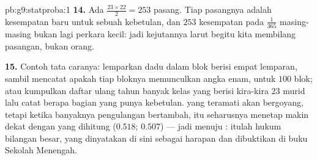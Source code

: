 \begin{solution}{pb:g9:statproba:1}
\textbf{14.} Ada $\frac{23 \times 22}{2} = 253$ pasang. Tiap pasangnya
adalah kesempatan baru untuk sebuah kebetulan, dan $253$ kesempatan
pada $\frac{1}{365}$ masing-masing bukan lagi perkara kecil: jadi
kejutannya larut begitu kita membilang pasangan, bukan orang.

\textbf{15.} Contoh tata caranya: lemparkan dadu dalam blok berisi
empat lemparan, sambil mencatat apakah tiap bloknya memunculkan angka
enam, untuk $100$ blok; atau kumpulkan daftar ulang tahun banyak kelas
yang berisi kira-kira $23$ murid lalu catat berapa bagian yang punya
kebetulan.  yang teramati akan bergoyang, tetapi
ketika banyaknya pengulangan bertambah,  itu seharusnya
menetap makin dekat dengan  yang dihitung
($0.518$; $0.507$) --- jadi  menuju : itulah
hukum bilangan besar, yang dinyatakan di sini sebagai harapan dan
dibuktikan di buku Sekolah Menengah.

\end{solution}

